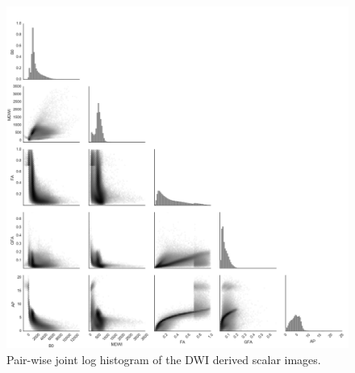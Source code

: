 \begin{figure}[H]
\includegraphics[width=\linewidth]{figure3}
\caption{Pair-wise joint log histogram of the DWI derived scalar images.}
\centering
\label{fig:APfigure3}
\end{figure}

